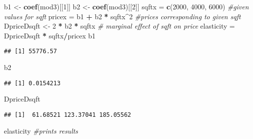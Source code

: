 \documentclass[
]{book}
\newenvironment{Shaded}{\begin{snugshade}}{\end{snugshade}}
\newcommand{\CommentTok}[1]{\textcolor[rgb]{0.56,0.35,0.01}{\textit{#1}}}
\newcommand{\DecValTok}[1]{\textcolor[rgb]{0.00,0.00,0.81}{#1}}
\newcommand{\FunctionTok}[1]{\textcolor[rgb]{0.13,0.29,0.53}{\textbf{#1}}}
\newcommand{\NormalTok}[1]{#1}
\newcommand{\OtherTok}[1]{\textcolor[rgb]{0.56,0.35,0.01}{#1}}
\newcommand{\SpecialCharTok}[1]{\textcolor[rgb]{0.81,0.36,0.00}{\textbf{#1}}}
\begin{document}
\begin{Shaded}
\begin{Highlighting}[]
\NormalTok{b1 }\OtherTok{\textless{}{-}} \FunctionTok{coef}\NormalTok{(mod3)[[}\DecValTok{1}\NormalTok{]]}
\NormalTok{b2 }\OtherTok{\textless{}{-}} \FunctionTok{coef}\NormalTok{(mod3)[[}\DecValTok{2}\NormalTok{]]}
\NormalTok{sqftx }\OtherTok{=} \FunctionTok{c}\NormalTok{(}\DecValTok{2000}\NormalTok{, }\DecValTok{4000}\NormalTok{, }\DecValTok{6000}\NormalTok{)  }\CommentTok{\#given values for sqft}
\NormalTok{pricex }\OtherTok{=}\NormalTok{ b1 }\SpecialCharTok{+}\NormalTok{ b2 }\SpecialCharTok{*}\NormalTok{ sqftx}\SpecialCharTok{\^{}}\DecValTok{2}  \CommentTok{\#prices corresponding to given sqft }
\NormalTok{DpriceDsqft }\OtherTok{\textless{}{-}} \DecValTok{2} \SpecialCharTok{*}\NormalTok{ b2 }\SpecialCharTok{*}\NormalTok{ sqftx  }\CommentTok{\# marginal effect of sqft on price}
\NormalTok{elasticity }\OtherTok{=}\NormalTok{ DpriceDsqft }\SpecialCharTok{*}\NormalTok{ sqftx}\SpecialCharTok{/}\NormalTok{pricex}
\NormalTok{b1}
\end{Highlighting}
\end{Shaded}

\begin{verbatim}
## [1] 55776.57
\end{verbatim}

\begin{Shaded}
\begin{Highlighting}[]
\NormalTok{b2}
\end{Highlighting}
\end{Shaded}

\begin{verbatim}
## [1] 0.0154213
\end{verbatim}

\begin{Shaded}
\begin{Highlighting}[]
\NormalTok{DpriceDsqft}
\end{Highlighting}
\end{Shaded}

\begin{verbatim}
## [1]  61.68521 123.37041 185.05562
\end{verbatim}

\begin{Shaded}
\begin{Highlighting}[]
\NormalTok{elasticity  }\CommentTok{\#prints results}
\end{Highlighting}
\end{Shaded}
\end{document}
